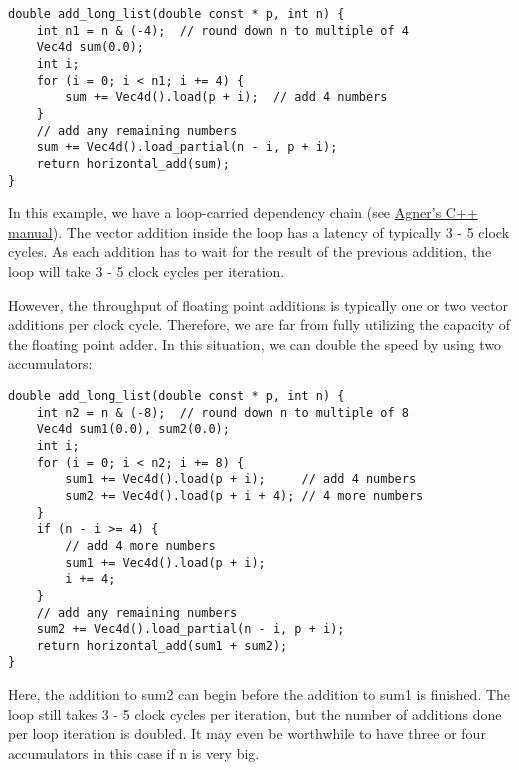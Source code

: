 \documentclass[vcl_manual.tex]{subfiles}
\begin{document}
\begin{example}
\label{exampleLoopAccumulator1}
\end{example}
\begin{lstlisting}[frame=single]
double add_long_list(double const * p, int n) {
    int n1 = n & (-4);  // round down n to multiple of 4
    Vec4d sum(0.0);
    int i;
    for (i = 0; i < n1; i += 4) {
        sum += Vec4d().load(p + i);  // add 4 numbers
    }
    // add any remaining numbers
    sum += Vec4d().load_partial(n - i, p + i);
    return horizontal_add(sum);
}
\end{lstlisting}

In this example, we have a loop-carried dependency chain (see
\href{https://www.agner.org/optimize/#manual_cpp}{Agner's C++ manual}). 
The vector addition inside the loop has a latency of typically 3 - 5 clock cycles. As each addition has to wait for the result of the previous addition, the loop will take 3 - 5 clock cycles per iteration.

However, the throughput of floating point additions is typically one or two vector additions per clock cycle. Therefore, we are far from fully utilizing the capacity of the floating point adder. In this situation, we can double the speed by using two accumulators:

\begin{example}
\label{exampleLoopAccumulator2}
\end{example}
\begin{lstlisting}[frame=single]
double add_long_list(double const * p, int n) {
    int n2 = n & (-8);  // round down n to multiple of 8
    Vec4d sum1(0.0), sum2(0.0);
    int i;
    for (i = 0; i < n2; i += 8) {
        sum1 += Vec4d().load(p + i);     // add 4 numbers
        sum2 += Vec4d().load(p + i + 4); // 4 more numbers
    }
    if (n - i >= 4) {
        // add 4 more numbers
        sum1 += Vec4d().load(p + i);
        i += 4;
    }
    // add any remaining numbers
    sum2 += Vec4d().load_partial(n - i, p + i);
    return horizontal_add(sum1 + sum2);
}
\end{lstlisting}

Here, the addition to sum2 can begin before the addition to sum1 is finished. The loop still takes 3 - 5 clock cycles per iteration, but the number of additions done per loop iteration is doubled. It may even be worthwhile to have three or four accumulators in this case if n is very big.
\end{document}
